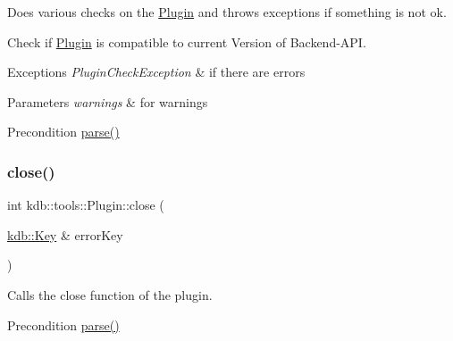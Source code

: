 Does various checks on the \hyperlink{classkdb_1_1tools_1_1Plugin}{Plugin} and throws exceptions if something is not ok. 


\begin{DoxyItemize}
\item Check if \hyperlink{classkdb_1_1tools_1_1Plugin}{Plugin} is compatible to current Version of Backend-\/\+A\+PI.
\end{DoxyItemize}


\begin{DoxyExceptions}{Exceptions}
{\em Plugin\+Check\+Exception} & if there are errors \\
\hline
\end{DoxyExceptions}

\begin{DoxyParams}{Parameters}
{\em warnings} & for warnings\\
\hline
\end{DoxyParams}
\begin{DoxyPrecond}{Precondition}
\hyperlink{classkdb_1_1tools_1_1Plugin_adfcba2fbdeb436a1083410df804d5fb0}{parse()} 
\end{DoxyPrecond}
\mbox{\label{classkdb_1_1tools_1_1Plugin_a40b5fd413f3f6da735680ed8d7c8a6a2}} 
\subsubsection{\texorpdfstring{close()}{close()}}
{\footnotesize\ttfamily int kdb\+::tools\+::\+Plugin\+::close (\begin{DoxyParamCaption}\item[{\hyperlink{classkdb_1_1Key}{kdb\+::\+Key} \&}]{error\+Key }\end{DoxyParamCaption})}



Calls the close function of the plugin. 

\begin{DoxyPrecond}{Precondition}
\hyperlink{classkdb_1_1tools_1_1Plugin_adfcba2fbdeb436a1083410df804d5fb0}{parse()} 
\end{DoxyPrecond}
\mbox{\label{classkdb_1_1tools_1_1Plugin_ac1a731f0fa0628a51ca9edf6385e8c3d}} 

